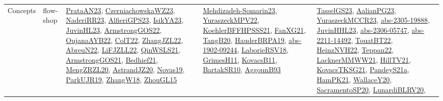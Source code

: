 {\begin{longtable}{lp{3cm}>{\raggedright}p{6cm}>{\raggedright}p{6cm}p{8cm}}
Concepts & flow-shop & \href{articles/PrataAN23.pdf}{PrataAN23}\cite{PrataAN23}, \href{articles/CzerniachowskaWZ23.pdf}{CzerniachowskaWZ23}\cite{CzerniachowskaWZ23}, \href{articles/NaderiRR23.pdf}{NaderiRR23}\cite{NaderiRR23}, \href{articles/AlfieriGPS23.pdf}{AlfieriGPS23}\cite{AlfieriGPS23}, \href{articles/IsikYA23.pdf}{IsikYA23}\cite{IsikYA23}, \href{papers/JuvinHL23.pdf}{JuvinHL23}\cite{JuvinHL23}, \href{papers/ArmstrongGOS22.pdf}{ArmstrongGOS22}\cite{ArmstrongGOS22}, \href{papers/OujanaAYB22.pdf}{OujanaAYB22}\cite{OujanaAYB22}, \href{articles/ColT22.pdf}{ColT22}\cite{ColT22}, \href{papers/ZhangJZL22.pdf}{ZhangJZL22}\cite{ZhangJZL22}, \href{articles/AbreuN22.pdf}{AbreuN22}\cite{AbreuN22}, \href{papers/LiFJZLL22.pdf}{LiFJZLL22}\cite{LiFJZLL22}, \href{articles/QinWSLS21.pdf}{QinWSLS21}\cite{QinWSLS21}, \href{papers/ArmstrongGOS21.pdf}{ArmstrongGOS21}\cite{ArmstrongGOS21}, \href{articles/Bedhief21.pdf}{Bedhief21}\cite{Bedhief21}, \href{articles/MengZRZL20.pdf}{MengZRZL20}\cite{MengZRZL20}, \href{articles/AstrandJZ20.pdf}{AstrandJZ20}\cite{AstrandJZ20}, \href{articles/Novas19.pdf}{Novas19}\cite{Novas19}, \href{papers/ParkUJR19.pdf}{ParkUJR19}\cite{ParkUJR19}, \href{articles/ZhangW18.pdf}{ZhangW18}\cite{ZhangW18}, \href{papers/ZhouGL15.pdf}{ZhouGL15}\cite{ZhouGL15} & \href{papers/Mehdizadeh-Somarin23.pdf}{Mehdizadeh-Somarin23}\cite{Mehdizadeh-Somarin23}, \href{articles/YuraszeckMPV22.pdf}{YuraszeckMPV22}\cite{YuraszeckMPV22}, \href{articles/KoehlerBFFHPSSS21.pdf}{KoehlerBFFHPSSS21}\cite{KoehlerBFFHPSSS21}, \href{articles/FanXG21.pdf}{FanXG21}\cite{FanXG21}, \href{papers/TangB20.pdf}{TangB20}\cite{TangB20}, \href{articles/HauderBRPA19.pdf}{HauderBRPA19}\cite{HauderBRPA19}, \href{articles/abs-1902-09244.pdf}{abs-1902-09244}\cite{abs-1902-09244}, \href{articles/LaborieRSV18.pdf}{LaborieRSV18}\cite{LaborieRSV18}, \href{papers/GrimesH11.pdf}{GrimesH11}\cite{GrimesH11}, \href{articles/KovacsB11.pdf}{KovacsB11}\cite{KovacsB11}, \href{articles/BartakSR10.pdf}{BartakSR10}\cite{BartakSR10}, \href{articles/AggounB93.pdf}{AggounB93}\cite{AggounB93} & \href{papers/TasselGS23.pdf}{TasselGS23}\cite{TasselGS23}, \href{papers/AalianPG23.pdf}{AalianPG23}\cite{AalianPG23}, \href{articles/YuraszeckMCCR23.pdf}{YuraszeckMCCR23}\cite{YuraszeckMCCR23}, \href{articles/abs-2305-19888.pdf}{abs-2305-19888}\cite{abs-2305-19888}, \href{papers/JuvinHHL23.pdf}{JuvinHHL23}\cite{JuvinHHL23}, \href{articles/abs-2306-05747.pdf}{abs-2306-05747}\cite{abs-2306-05747}, \href{articles/abs-2211-14492.pdf}{abs-2211-14492}\cite{abs-2211-14492}, \href{papers/TouatBT22.pdf}{TouatBT22}\cite{TouatBT22}, \href{articles/HeinzNVH22.pdf}{HeinzNVH22}\cite{HeinzNVH22}, \href{papers/Teppan22.pdf}{Teppan22}\cite{Teppan22}, \href{papers/LacknerMMWW21.pdf}{LacknerMMWW21}\cite{LacknerMMWW21}, \href{papers/HillTV21.pdf}{HillTV21}\cite{HillTV21}, \href{papers/KovacsTKSG21.pdf}{KovacsTKSG21}\cite{KovacsTKSG21}, \href{articles/PandeyS21a.pdf}{PandeyS21a}\cite{PandeyS21a}, \href{articles/HamPK21.pdf}{HamPK21}\cite{HamPK21}, \href{articles/WallaceY20.pdf}{WallaceY20}\cite{WallaceY20}, \href{articles/SacramentoSP20.pdf}{SacramentoSP20}\cite{SacramentoSP20}, \href{articles/LunardiBLRV20.pdf}{LunardiBLRV20}\cite{LunardiBLRV20}, 
\end{longtable}}
